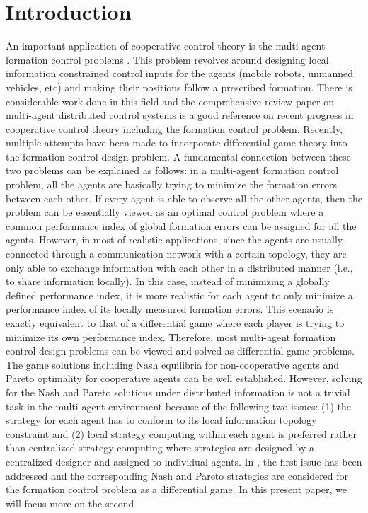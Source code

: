 \documentclass[letterpaper, 10 pt, conference,onecolumn]{ieeeconf}  %
\begin{document}
\newtheorem{Def}{Definition}
\newtheorem{Asu}{Assumption}
\newtheorem{thm}{Theorem}
\newtheorem{Pro}{Proposition}
\newtheorem{Alg}{Algorithm}
\newtheorem{Lem}{Lemma}
\newtheorem{Rmk}{Remark}


\section{Introduction}
{An} important application of cooperative control theory \cite{ren,Qu} {is} the multi-agent formation control problems \cite{Stipanovic2004,Keviczky2008,JiananWang2012}. {This problem revolves around designing} local information constrained control inputs for the agents (mobile robots, unmanned vehicles, etc) and {making} their positions {follow} a prescribed formation. There {is considerable work} done in this field and the comprehensive review paper \cite{Cao2013} on multi-agent distributed control systems is a good reference on {recent} progress {in} cooperative control theory including the formation control problem. Recently, multiple attempts \cite{anderson1998formation,DongbingGu2008,SemsarKazerooni20092205} have been made to incorporate {differential} game theory \cite{Isaacs,Basar} into the formation control design problem. {A fundamental connection {between these two problems} can be explained as follows: in a multi-agent formation control problem, all the agents are basically trying to minimize the formation errors between each other. If every agent is able to observe all the other agents, then the problem can be essentially viewed as an optimal control problem where a common performance index of global formation errors can be assigned for all the agents. However, in most of {realistic} applications,} since the agents are usually connected through {a} communication network {with} a certain topology, they are only able to exchange information with each other in a distributed manner (i.e., to share information locally). {In {this} case, instead of minimizing a globally defined performance index, it is {more realistic} for each agent to only minimize a performance index of its locally measured formation errors. This scenario is exactly equivalent to that of a differential game where each player is trying to minimize its own performance index. Therefore, most {multi-agent} formation control design {problems} can be viewed and solved as {differential game problems}. The game solutions including {Nash equilibria} for non-cooperative agents and Pareto optimality for cooperative agents can {be} well established. However, solving {for} the Nash and Pareto solutions under distributed information is not a trivial task in the multi-agent environment because of the following two {issues}: (1) the strategy for each agent has to conform to its local information topology constraint and (2) local strategy computing within each agent is preferred rather than centralized strategy computing where strategies are designed by a centralized designer and assigned to individual agents.} In \cite{DongbingGu2008,SemsarKazerooni20092205}, the first {issue} has been addressed and the corresponding Nash and Pareto strategies are considered for the formation control problem as a differential game. {In} this present paper, we will focus more on the second 
\end{document}
